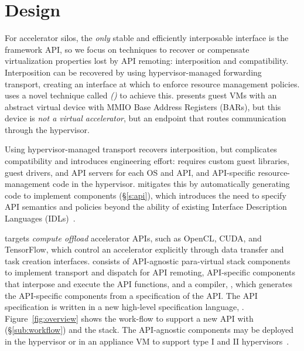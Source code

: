 
\graphicspath{{images/}}

\section{Design}
\label{s:design}
\label{s:motivation}

For accelerator silos, the \emph{only} stable and
efficiently interposable interface is the framework API, so
we focus on techniques to recover or compensate virtualization properties lost by
API remoting: interposition and compatibility.
Interposition can be recovered by using hypervisor-managed forwarding transport,
creating an interface at which to enforce resource management policies.
\AvA uses a novel technique called \emph{\hirafull (\hira)} to achieve this.
\hira presents guest VMs with an abstract virtual device with MMIO Base Address Registers (BARs), but this device is \emph{not a virtual accelerator}, but an endpoint that
routes communication through the hypervisor.

Using hypervisor-managed transport recovers interposition, but complicates compatibility and introduces engineering effort:
\hira requires custom guest libraries, guest drivers, and API servers for each OS and API, and API-specific resource-management code in the hypervisor.
\AvA mitigates this by
automatically generating code to implement \hira components (\S\ref{s:api}), which introduces the
need to specify API semantics and policies beyond the ability of existing Interface Description Languages (IDLs)~\cite{Lamb1987,MSIDL}.

\AvA targets \emph{compute offload} accelerator APIs,
such as OpenCL, CUDA, and TensorFlow, which control an accelerator explicitly
through data transfer and task creation interfaces.
\AvA consists of API-agnostic para-virtual stack components to
implement transport and dispatch for API remoting,
API-specific components that interpose and execute the API functions,
and a compiler, \CAvA, which generates the API-specific components from a
specification of the API.
The API specification is written in a new high-level specification language, \Lapis.
Figure~\ref{fig:overview} shows the work-flow to support a new API with \AvA (\S\ref{sub:workflow}) and the \AvA stack.
The API-agnostic components may be deployed in the hypervisor or in an appliance VM to support type I and II hypervisors~\cite{Popek1974-xx}.

